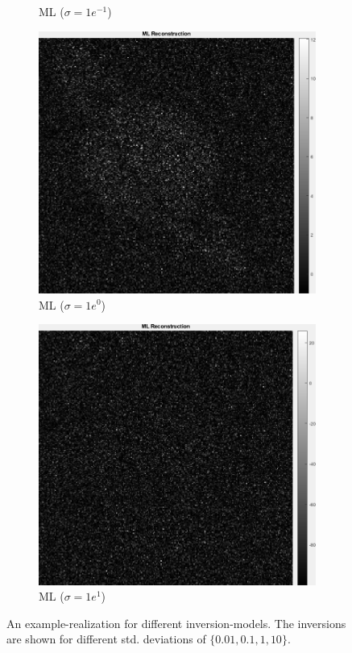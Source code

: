 \documentclass[a4paper, 11pt]{article}
\begin{document}
\begin{figure}[h]
\begin{subfigure}[b]{0.22\textwidth}
        \caption{ML ($\sigma=1e^{-1}$)}
        \label{fig:ML-2}
    \end{subfigure}
    \begin{subfigure}[b]{0.22\textwidth}
        \includegraphics[width=\textwidth]{../Figures/MLReconstructionNoiseSigma1e0.png}
        \caption{ML ($\sigma=1e^{0}$)}
        \label{fig:ML-1}
    \end{subfigure}
    \begin{subfigure}[b]{0.22\textwidth}
        \includegraphics[width=\textwidth]{../Figures/MLReconstructionNoiseSigma1e1.png}
        \caption{ML ($\sigma=1e^{1}$)}
        \label{fig:ML-0}
    \end{subfigure}
\caption{An example-realization for different inversion-models. The inversions are shown for different std. deviations of $\{0.01,0.1, 1,10\}$.}
\label{fig:inversionModel}
\end{figure}
\end{document}
